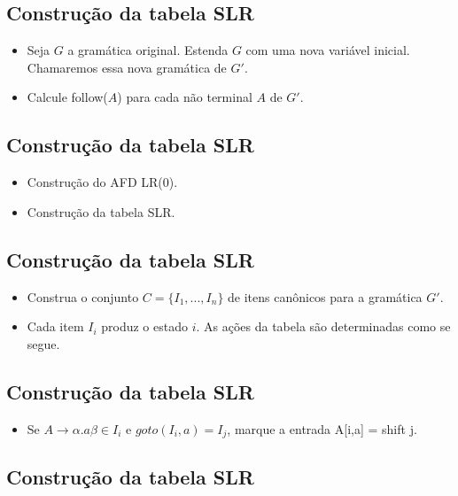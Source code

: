 \documentclass[11pt]{article}
\begin{document}
\subsection*{Construção da tabela SLR}
\label{sec:org74dfa0e}

\begin{itemize}
\item Seja \(G\) a gramática original. Estenda \(G\) com uma nova variável inicial.
Chamaremos essa nova gramática de \(G'\).

\item Calcule follow(\(A\)) para cada não terminal \(A\) de \(G'\).
\end{itemize}
\subsection*{Construção da tabela SLR}
\label{sec:orgfd36233}

\begin{itemize}
\item Construção do AFD LR(0).

\item Construção da tabela SLR.
\end{itemize}
\subsection*{Construção da tabela SLR}
\label{sec:org5c6d1e0}

\begin{itemize}
\item Construa o conjunto \(C=\{I_1,...,I_n\}\) de itens canônicos para a
gramática \(G'\).

\item Cada item \(I_i\) produz o estado \(i\). As ações da tabela são
determinadas como se segue.
\end{itemize}
\subsection*{Construção da tabela SLR}
\label{sec:org2ead519}

\begin{itemize}
\item Se \(A \to \alpha .a\beta \in I_i\) e \(goto(I_i,a) = I_j\), marque a
entrada A[i,a] = shift j.
\end{itemize}
\subsection*{Construção da tabela SLR}
\label{sec:orged7e2a6}
\end{document}
